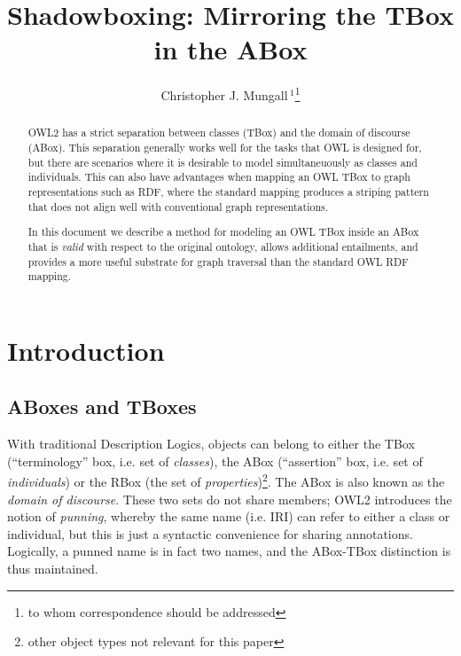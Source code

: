 \documentclass{my}
\begin{document}

\title{Shadowboxing: Mirroring the TBox in the ABox}

\author{Christopher J. Mungall\,$^{1}$\footnote{to whom correspondence should be addressed}}
\address{$^{1}$Genomics Division, Lawrence Berkeley National Laboratory, MS84R017, 1 Cyclotron Road, Berkeley, CA 94720 USA}

\history{}

\editor{}

\maketitle

\begin{abstract}

OWL2 has a strict separation between classes (TBox) and the domain of
discourse (ABox). This separation generally works well for the tasks
that OWL is designed for, but there are scenarios where it is
desirable to model simultaneuously as classes and individuals. This
can also have advantages when mapping an OWL TBox to graph
representations such as RDF, where the standard mapping produces a
striping pattern that does not align well with conventional graph
representations.

In this document we describe a method for modeling an OWL TBox inside
an ABox that is \emph{valid} with respect to the original ontology,
allows additional entailments, and provides a more useful substrate
for graph traversal than the standard OWL RDF mapping. 

\end{abstract}

\section{Introduction}

\subsection{ABoxes and TBoxes}

With traditional Description Logics, objects can belong to either the
TBox (``terminology'' box, i.e. set of \emph{classes}), the ABox
(``assertion'' box, i.e. set of \emph{individuals}) or the RBox (the
set of \emph{properties})\footnote{other object types not relevant for
  this paper}. The ABox is also known as the \emph{domain of
  discourse}. These two sets do not share members; OWL2 introduces the
notion of \emph{punning}, whereby the same name (i.e. IRI) can refer
to either a class or individual, but this is just a syntactic
convenience for sharing annotations. Logically, a punned name is in
fact two names, and the ABox-TBox distinction is thus maintained.
\end{document}
